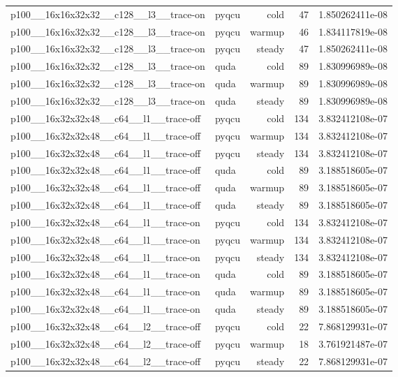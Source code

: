 \begin{table}[htbp]
\begin{tabular}{@{}llrrr@{}}
p100\_\_16x16x32x32\_\_c128\_\_l3\_\_trace-on & pyqcu & cold & 47 & 1.850262411e-08 \\
p100\_\_16x16x32x32\_\_c128\_\_l3\_\_trace-on & pyqcu & warmup & 46 & 1.834117819e-08 \\
p100\_\_16x16x32x32\_\_c128\_\_l3\_\_trace-on & pyqcu & steady & 47 & 1.850262411e-08 \\
p100\_\_16x16x32x32\_\_c128\_\_l3\_\_trace-on & quda & cold & 89 & 1.830996989e-08 \\
p100\_\_16x16x32x32\_\_c128\_\_l3\_\_trace-on & quda & warmup & 89 & 1.830996989e-08 \\
p100\_\_16x16x32x32\_\_c128\_\_l3\_\_trace-on & quda & steady & 89 & 1.830996989e-08 \\
p100\_\_16x32x32x48\_\_c64\_\_l1\_\_trace-off & pyqcu & cold & 134 & 3.832412108e-07 \\
p100\_\_16x32x32x48\_\_c64\_\_l1\_\_trace-off & pyqcu & warmup & 134 & 3.832412108e-07 \\
p100\_\_16x32x32x48\_\_c64\_\_l1\_\_trace-off & pyqcu & steady & 134 & 3.832412108e-07 \\
p100\_\_16x32x32x48\_\_c64\_\_l1\_\_trace-off & quda & cold & 89 & 3.188518605e-07 \\
p100\_\_16x32x32x48\_\_c64\_\_l1\_\_trace-off & quda & warmup & 89 & 3.188518605e-07 \\
p100\_\_16x32x32x48\_\_c64\_\_l1\_\_trace-off & quda & steady & 89 & 3.188518605e-07 \\
p100\_\_16x32x32x48\_\_c64\_\_l1\_\_trace-on & pyqcu & cold & 134 & 3.832412108e-07 \\
p100\_\_16x32x32x48\_\_c64\_\_l1\_\_trace-on & pyqcu & warmup & 134 & 3.832412108e-07 \\
p100\_\_16x32x32x48\_\_c64\_\_l1\_\_trace-on & pyqcu & steady & 134 & 3.832412108e-07 \\
p100\_\_16x32x32x48\_\_c64\_\_l1\_\_trace-on & quda & cold & 89 & 3.188518605e-07 \\
p100\_\_16x32x32x48\_\_c64\_\_l1\_\_trace-on & quda & warmup & 89 & 3.188518605e-07 \\
p100\_\_16x32x32x48\_\_c64\_\_l1\_\_trace-on & quda & steady & 89 & 3.188518605e-07 \\
p100\_\_16x32x32x48\_\_c64\_\_l2\_\_trace-off & pyqcu & cold & 22 & 7.868129931e-07 \\
p100\_\_16x32x32x48\_\_c64\_\_l2\_\_trace-off & pyqcu & warmup & 18 & 3.761921487e-07 \\
p100\_\_16x32x32x48\_\_c64\_\_l2\_\_trace-off & pyqcu & steady & 22 & 7.868129931e-07 \\

\end{tabular}
\end{table}
